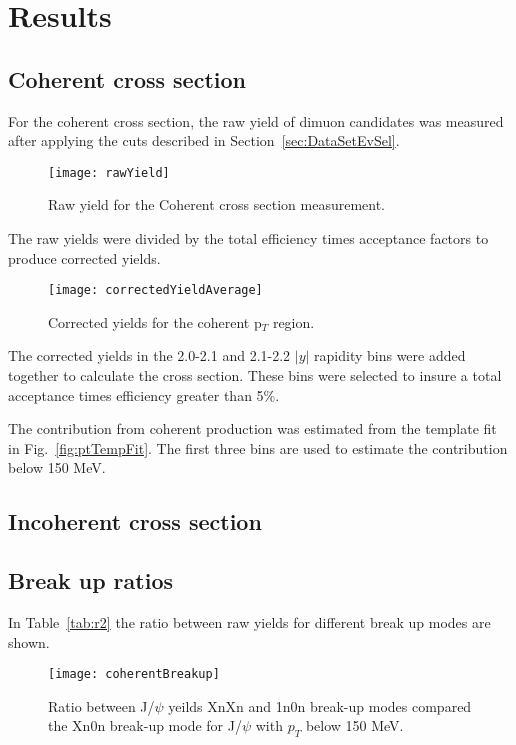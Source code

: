 \chapter{Results} 
  \section{Coherent cross section}
  For the coherent cross section, the raw yield of dimuon candidates was
    measured after applying the cuts described in Section~\ref{sec:DataSetEvSel}.
  \begin{figure}[!Hhtb]
    \centering
    \texttt{[image: rawYield]}
    \caption{Raw yield for the Coherent cross section measurement.}
    \label{fig:rawYieldCo}
  \end{figure}

  The raw yields were divided by the total efficiency times acceptance factors
    to produce corrected yields.
  \begin{figure}[!Hhtb]
    \centering
    \texttt{[image: correctedYieldAverage]}
    \caption{Corrected yields for the coherent p$_{T}$ region.}
    \label{fig:corYieldCo}
  \end{figure}

  The corrected yields in the 2.0-2.1 and 2.1-2.2 $|y|$ rapidity bins were added 
    together to calculate the cross section. 
  These bins were selected to insure a total acceptance times efficiency 
    greater than 5\%.

  The contribution from coherent production was estimated from the template fit
    in Fig.~\ref{fig:ptTempFit}.
  The first three bins are used to estimate the contribution below 150 MeV.

  \section{Incoherent cross section}
  \section{Break up ratios}
    In Table~\ref{tab:r2} the ratio between raw yields for different break up 
      modes are shown.
    \begin{figure}[!Hhtb]
      \centering
      \texttt{[image: coherentBreakup]}
      \caption{Ratio between J/$\psi$ yeilds XnXn and 1n0n break-up modes 
        compared the Xn0n break-up mode for J/$\psi$ with $p_{T}$ below 150 
        MeV.}
      \label{fig:coherentBreakUp}
    \end{figure}
   
